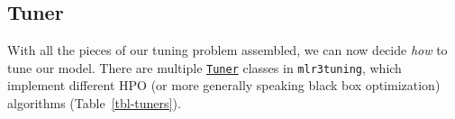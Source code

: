 \hypertarget{sec-tuner}{%
\subsection{Tuner}\label{sec-tuner}}

With all the pieces of our tuning problem assembled, we can now decide
\emph{how} to tune our model. There are multiple
\href{https://mlr3tuning.mlr-org.com/reference/Tuner.html}{\texttt{Tuner}}
classes in \texttt{mlr3tuning}, which implement different HPO (or more
generally speaking black box optimization)
algorithms (Table~\ref{tbl-tuners}).

\hypertarget{tbl-tuners}{}
